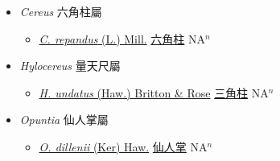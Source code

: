 
  \begin{itemize}
 \item[] \textit{Cereus} 六角柱屬
                    
  \begin{itemize}
        \item[] \href{http://www.theplantlist.org/tpl1.1/search?q=Cereus+repandus}{\textit{C. repandus} (L.) Mill.}   \href{\detokenize{http://taibnet.sinica.edu.tw/chi/taibnet_species_list.php?T2=六角柱&T2_new_value=true&fr=y}}{六角柱} NA$^n$
  \end{itemize}
 \item[] \textit{Hylocereus} 量天尺屬
                    
  \begin{itemize}
        \item[] \href{http://www.theplantlist.org/tpl1.1/search?q=Hylocereus+undatus}{\textit{H. undatus} (Haw.) Britton \& Rose}   \href{\detokenize{http://taibnet.sinica.edu.tw/chi/taibnet_species_list.php?T2=三角柱&T2_new_value=true&fr=y}}{三角柱} NA$^n$
  \end{itemize}
 \item[] \textit{Opuntia} 仙人掌屬
                    
  \begin{itemize}
        \item[] \href{http://www.theplantlist.org/tpl1.1/search?q=Opuntia+dillenii}{\textit{O. dillenii} (Ker) Haw.}   \href{\detokenize{http://taibnet.sinica.edu.tw/chi/taibnet_species_list.php?T2=仙人掌&T2_new_value=true&fr=y}}{仙人掌} NA$^n$
  \end{itemize}
  \end{itemize}
